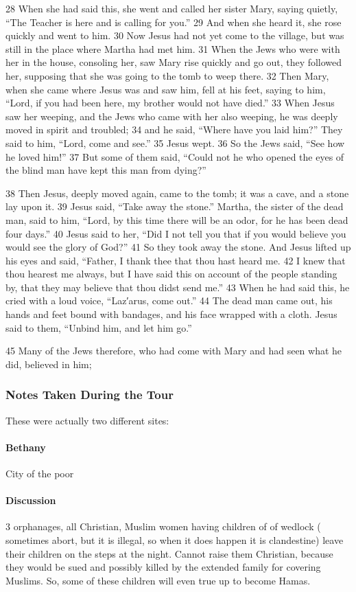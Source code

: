 \documentclass[letterpaper]{report}
\begin{document}
\begin{multicols}{2}
28 When she had said this, she went and called her sister Mary, saying quietly, “The Teacher is here and is calling for you.” 29 And when she heard it, she rose quickly and went to him. 30 Now Jesus had not yet come to the village, but was still in the place where Martha had met him. 31 When the Jews who were with her in the house, consoling her, saw Mary rise quickly and go out, they followed her, supposing that she was going to the tomb to weep there. 32 Then Mary, when she came where Jesus was and saw him, fell at his feet, saying to him, “Lord, if you had been here, my brother would not have died.” 33 When Jesus saw her weeping, and the Jews who came with her also weeping, he was deeply moved in spirit and troubled; 34 and he said, “Where have you laid him?” They said to him, “Lord, come and see.” 35 Jesus wept. 36 So the Jews said, “See how he loved him!” 37 But some of them said, “Could not he who opened the eyes of the blind man have kept this man from dying?”

38 Then Jesus, deeply moved again, came to the tomb; it was a cave, and a stone lay upon it. 39 Jesus said, “Take away the stone.” Martha, the sister of the dead man, said to him, “Lord, by this time there will be an odor, for he has been dead four days.” 40 Jesus said to her, “Did I not tell you that if you would believe you would see the glory of God?” 41 So they took away the stone. And Jesus lifted up his eyes and said, “Father, I thank thee that thou hast heard me. 42 I knew that thou hearest me always, but I have said this on account of the people standing by, that they may believe that thou didst send me.” 43 When he had said this, he cried with a loud voice, “Laz′arus, come out.” 44 The dead man came out, his hands and feet bound with bandages, and his face wrapped with a cloth. Jesus said to them, “Unbind him, and let him go.”

45 Many of the Jews therefore, who had come with Mary and had seen what he did, believed in him;
\end{multicols}

\subsubsection{Notes Taken During the Tour}
These were actually two different sites:
\paragraph{Bethany}
City of the poor

\paragraph{Discussion}
3 orphanages, all Christian, Muslim women having children of of wedlock ( sometimes abort, but it is illegal, so when it does happen it is clandestine) leave their children on the steps at the night. Cannot raise them Christian, because they would be sued and possibly killed by the extended family for covering Muslims. So, some of these children will even true up to become Hamas.
\end{document}
